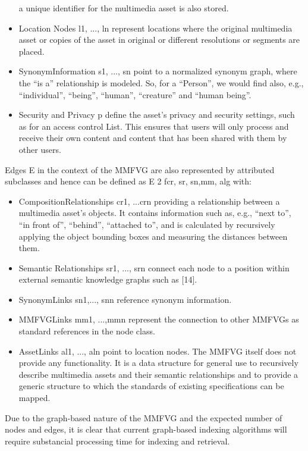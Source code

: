 \begin{itemize}
a unique identifier for the multimedia asset is also stored.
\item Location Nodes l1, ..., ln represent locations where the original multimedia asset or
copies of the asset in original or different resolutions or segments are placed.
\item SynonymInformation s1, ..., sn point to a normalized synonym graph, where the “is
a” relationship is modeled. So, for a “Person”, we would find also, e.g., “individual”,
“being”, “human”, “creature” and “human being”.
\item Security and Privacy p define the asset’s privacy and security settings, such as for an
access control List. This ensures that users will only process and receive their own
content and content that has been shared with them by other users.
\end{itemize}

Edges E in the context of the MMFVG are also represented by attributed subclasses
and hence can be defined as E 2 fcr, sr, sn,mm, alg with:
\begin{itemize}
\item CompositionRelationships cr1, ...crn providing a relationship between a multimedia
asset’s objects. It contains information such as, e.g., “next to”, “in front of”, “behind”,
“attached to”, and is calculated by recursively applying the object bounding boxes and
measuring the distances between them.
\item Semantic Relationships sr1, ..., srn connect each node to a position within external
semantic knowledge graphs such as [14].
\item SynonymLinks sn1,..., snn reference synonym information.
\item MMFVGLinks mm1, ...,mmn represent the connection to other MMFVGs as standard
references in the node class.
\item AssetLinks al1, ..., aln point to location nodes.
The MMFVG itself does not provide any functionality. It is a data structure for
general use to recursively describe multimedia assets and their semantic relationships
and to provide a generic structure to which the standards of existing specifications can
be mapped.
\end{itemize}

Due to the graph-based nature of the MMFVG and the expected number of nodes
and edges, it is clear that current graph-based indexing algorithms will require substancial
processing time for indexing and retrieval.

